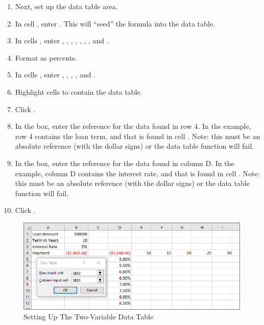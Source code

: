 \begin{enumerate}
	\item Next, set up the data table area.
	\item In cell , enter . This will ``seed'' the  formula into the data table.
	\item In cells , enter , , , , , , , and .
	\item Format  as percents.
	\item In cells , enter , , , , and .
	\item Highlight cells  to contain the data table.
	\item Click .
	\item In the  box, enter the reference for the data found in row 4. In the example, row 4 contains the loan term, and that is found in cell . Note: this must be an absolute reference (with the dollar signs) or the data table function will fail.
	\item In the  box, enter the reference for the data found in column D. In the example, column D contains the interest rate, and that is found in cell . Note: this must be an absolute reference (with the dollar signs) or the data table function will fail.
	\item Click .
\end{enumerate}

\begin{figure}[H]
	\centering
	\includegraphics[width=\maxwidth{.95\linewidth}]{gfx/ch08_fig21}
	\caption{Setting Up The Two-Variable Data Table}
	\label{08:fig21}
\end{figure}

